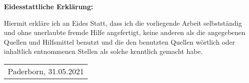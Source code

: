 \thispagestyle{empty}    %
\sffamily
\vspace*{16cm}
\textbf{Eidesstattliche Erkl\"arung:}
\parskip 12pt

Hiermit erkl\"are ich an Eides Statt, dass ich die vorliegende Arbeit selbstst\"andig und ohne unerlaubte fremde Hilfe angefertigt, keine anderen als die angegebenen Quellen und Hilfsmittel benutzt und die den benutzten Quellen w\"ortlich oder inhaltlich entnommenen Stellen als solche kenntlich gemacht habe.

\vspace*{2.4cm}

		\begin{tabular}{l}
		  \cline{1-1}
		  \begin{minipage}[t]{0.5\textwidth}
		    
		    Paderborn, 31.05.2021
			\end{minipage}
		\end{tabular}
\cleardoublepage